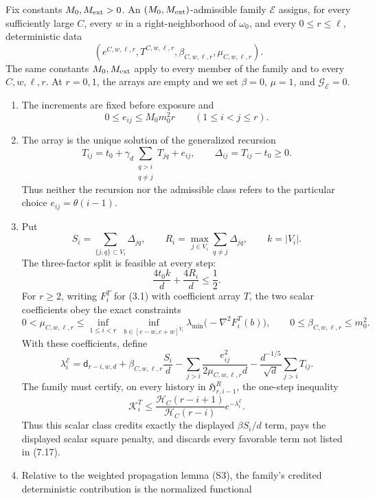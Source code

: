 \begin{definition}\label{def:admissible}
Fix constants \(M_0,M_{\rm ext}>0\).  An
\((M_0,M_{\rm ext})\)-admissible family \(\mathcal E\) assigns, for every
sufficiently large \(C\), every \(w\) in a right-neighborhood of
\(\omega_0\), and every \(0\le r\le\ell\), deterministic data
\[
 (e^{C,w,\ell,r},T^{C,w,\ell,r},
   \beta_{C,w,\ell,r},\mu_{C,w,\ell,r}).
\]
The same constants \(M_0,M_{\rm ext}\) apply to every member of the family
and to every \(C,w,\ell,r\).  At \(r=0,1\), the arrays are empty and we set
\(\beta=0\), \(\mu=1\), and \(\mathcal G_{\mathcal E}=0\).
\begin{enumerate}[label=(A\arabic*)]
\item The increments are fixed before exposure and
\[
 0\le e_{ij}\le M_0m_0^2r\qquad(1\le i<j\le r).
\tag{7.13}
\]
\item The array is the unique solution of the generalized recursion
\[
 T_{ij}=t_0+\gamma_d
 \sum_{\substack{q>i\\q\ne j}}T_{jq}+e_{ij},
 \qquad \Delta_{ij}=T_{ij}-t_0\ge0.
\tag{7.14}
\]
Thus neither the recursion nor the admissible class refers to the particular
choice \(e_{ij}=\theta(i-1)\).
\item Put
\[
 S_i=\sum_{\{j,q\}\subset V_i}\Delta_{jq},\qquad
 R_i=\max_{j\in V_i}\sum_{q\ne j}\Delta_{jq},\qquad k=|V_i|.
\]
The three-factor split is feasible at every step:
\[
 \frac{4t_0k}{d}+\frac{4R_i}{d}\le\frac12.
\tag{7.15}
\]
For \(r\ge2\), writing \(F_i^T\) for (3.1) with coefficient array \(T\), the
two scalar coefficients obey the exact constraints
\[
 0<\mu_{C,w,\ell,r}\le
 \inf_{1\le i<r}\ \inf_{b\in[c-w,c+w]^{V_i}}
 \lambda_{\min}\!\bigl(-\nabla^2F_i^T(b)\bigr),
 \qquad 0\le\beta_{C,w,\ell,r}\le m_0^2.
\tag{7.16}
\]
With these coefficients, define
\[
 \lambda_i^{\mathcal E}=\mathsf d_{r-i,w,d}
 +\beta_{C,w,\ell,r}\frac{S_i}{d}
 -\sum_{j>i}\frac{e_{ij}^2}{2\mu_{C,w,\ell,r}d}
 -\frac{d^{-1/5}}{\sqrt d}\sum_{j>i}T_{ij}.
\tag{7.17}
\]
The family must certify, on every history in
\(\mathfrak H^R_{r,i-1}\), the one-step inequality
\[
 \mathcal K_i^T\le
 \frac{\mathcal H_C(r-i+1)}{\mathcal H_C(r-i)}
 e^{-\lambda_i^{\mathcal E}}.
\tag{7.18}
\]
Thus this scalar class credits exactly the displayed \(\beta S_i/d\) term,
pays the displayed scalar square penalty, and discards every favorable term
not listed in (7.17).
\item Relative to the weighted propagation lemma (S3), the family's credited
deterministic contribution is the normalized functional

\end{enumerate}
\end{definition}
